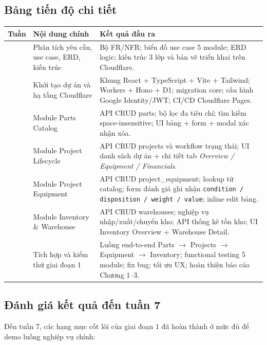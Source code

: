 \subsection{Bảng tiến độ chi tiết}
\begin{longtable}{>{\raggedright\arraybackslash}p{1.1cm} >{\raggedright\arraybackslash}p{4.3cm} >{\raggedright\arraybackslash}p{8.5cm}}
\toprule
\textbf{Tuần} & \textbf{Nội dung chính} & \textbf{Kết quả đầu ra} \\
\midrule
1 & Phân tích yêu cầu, use case, ERD, kiến trúc & Bộ FR/NFR; biểu đồ use case 5 module; ERD logic; kiến trúc 3 lớp và bản vẽ triển khai trên Cloudflare. \\
2 & Khởi tạo dự án và hạ tầng Cloudflare & Khung React + TypeScript + Vite + Tailwind; Workers + Hono + D1; migration core; cấu hình Google Identity/JWT; CI/CD Cloudflare Pages. \\
3 & Module Parts Catalog & API CRUD parts; bộ lọc đa tiêu chí; tìm kiếm space-insensitive; UI bảng + form + modal xác nhận xóa. \\
4 & Module Project Lifecycle & API CRUD projects và workflow trạng thái; UI danh sách dự án + chi tiết tab \emph{Overview / Equipment / Financials}. \\
5 & Module Project Equipment & API CRUD project\_equipment; lookup từ catalog; form đánh giá ghi nhận \texttt{condition / disposition / weight / value}; inline edit bảng. \\
6 & Module Inventory \& Warehouse & API CRUD warehouses; nghiệp vụ nhập/xuất/chuyển kho; API thống kê tồn kho; UI Inventory Overview + Warehouse Detail. \\
7 & Tích hợp và kiểm thử giai đoạn 1 & Luồng end-to-end Parts $\rightarrow$ Projects $\rightarrow$ Equipment $\rightarrow$ Inventory; functional testing 5 module; fix bug; tối ưu UX; hoàn thiện báo cáo Chương 1--3. \\
\bottomrule
\end{longtable}

\subsection{Đánh giá kết quả đến tuần 7}
Đến tuần 7, các hạng mục cốt lõi của giai đoạn 1 đã hoàn thành ở mức đủ để demo luồng nghiệp vụ chính:

